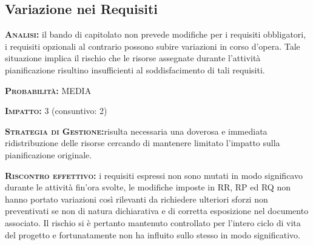 \subsection{Variazione nei Requisiti}

\begin{description}
	\item{\scshape\bfseries Analisi:} il bando di capitolato non prevede modifiche per i requisiti obbligatori, i requisiti opzionali al contrario possono subire variazioni in corso d'opera. Tale situazione implica il rischio che le risorse assegnate durante l'attività pianificazione risultino insufficienti al soddisfacimento di tali requisiti.
	\item{\scshape\bfseries Probabilità:} MEDIA
	\item{\scshape\bfseries Impatto:} 3 (consuntivo: 2)
	\item{\scshape\bfseries Strategia di Gestione:}risulta necessaria una doverosa e immediata ridistribuzione delle risorse cercando di mantenere limitato l'impatto sulla pianificazione originale.
	\item{\scshape\bfseries Riscontro effettivo:} i requisiti espressi non sono mutati in modo significavo durante le attività fin'ora svolte, le modifiche imposte in RR, RP ed RQ non hanno portato variazioni così rilevanti da richiedere ulteriori sforzi non preventivati se non di natura dichiarativa e di corretta esposizione nel documento associato. Il rischio si è pertanto mantenuto controllato per l'intero ciclo di vita del progetto e fortunatamente non ha influito sullo stesso in modo significativo.
\end{description}

